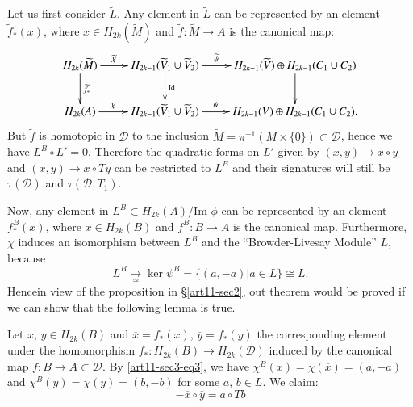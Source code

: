 Let us first consider $\widetilde{L}$. Any element in $\widetilde{L}$ can be represented by an element $\widetilde{f}_{*}(x)$, where $x\in H_{2k}(\widetilde{M})$ and $\widetilde{f}:\widetilde{M}\to A$ is the canonical map:
\[
\xymatrix{
H_{2k}(\widetilde{M})\ar[d]^-{\widetilde{f}_{*}}\ar[r]^-{\widetilde{\chi}} & H_{2k-1}(\widetilde{V}_{1}\cup \widetilde{V}_{2})\ar[d]^-{\text{Id}}\ar[r]^-{\widetilde{\psi}} & H_{2k-1}(\widetilde{V})\oplus H_{2k-1}(C_{1}\cup C_{2})\ar[d]\\
H_{2k}(A)\ar[r]^-{\chi} & H_{2k-1}(\widetilde{V}_{1}\cup \widetilde{V}_{2})\ar[r]^-{\psi} & H_{2k-1}(V)\oplus H_{2k-1}(C_{1}\cup C_{2}).
}
\]
But $\widetilde{f}$ is homotopic in $\mathscr{D}$ to the inclusion $\widetilde{M}=\pi^{-1}(M\times \{0\})\subset \mathscr{D}$, hence we have $L^{B}\circ L'=0$. Therefore the quadratic forms on $L'$ given by $(x,y)\to x\circ y$ and $(x,y)\to x\circ Ty$ can be restricted to $L^{B}$ and their signatures will still be $\tau(\mathscr{D})$ and $\tau(\mathscr{D},T_{1})$.

Now, any element in $L^{B}\subset H_{2k}(A)/\text{Im~}\phi$ can be represented by an element $f^{B}_{*}(x)$, where $x\in H_{2k}(B)$ and $f^{B}:B\to A$ is the canonical map. Furthermore, $\chi$ induces an isomorphism between $L^{B}$ and the ``Browder-Livesay Module'' $L$, because
$$
L^{B}\xrightarrow[\cong]{} \ker \psi^{B}=\{(a,-a) | a\in L\}\cong L.
$$
Hence\pageoriginale in view of the proposition in \S\ref{art11-sec2}, out theorem would be proved if we can show that the following lemma is true.

\begin{lemma*}
Let $x$, $y\in H_{2k}(B)$ and $\overline{x}=f_{*}(x)$, $\overline{y}=f_{*}(y)$ the corresponding element under the homomorphism $f_{*}:H_{2k}(B)\to H_{2k}(\mathscr{D})$ induced by the canonical map $f:B\to A\subset \mathscr{D}$. By \eqref{art11-sec3-eq3}, we have $\chi^{B}(x)=\chi(\overline{x})=(a,-a)$ and $\chi^{B}(y)=\chi(\overline{y})=(b,-b)$ for some $a$, $b\in L$. We claim:
\begin{equation}
-\overline{x}\circ \overline{y}=a\circ Tb\label{art11-sec3-eq4}
\end{equation}
\end{lemma*}

